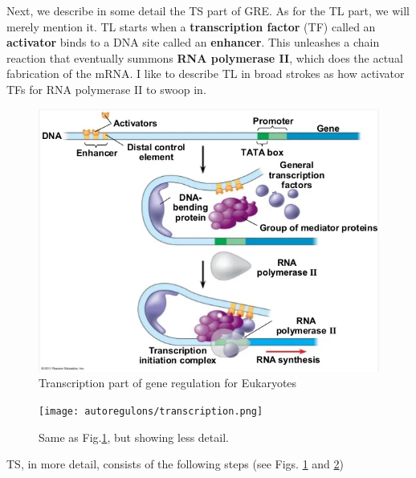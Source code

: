 Next, we describe
in some detail the TS
part of GRE. As for the TL
part, we will merely mention it. TL starts
when a {\bf transcription factor} (TF) called an {\bf activator}
binds to a DNA site called
an {\bf enhancer}. This unleashes
a chain reaction that eventually summons {\bf RNA polymerase II}, which does the actual fabrication of the mRNA. I like to describe TL in broad strokes as how 
activator TFs   for RNA polymerase II to swoop in.

\begin{figure}[h!]
\centering
\includegraphics[width=5in]
{autoregulons/transcription-detailed}
\caption{Transcription part of gene regulation for Eukaryotes}
\label{fig-transcription-detailed}
\end{figure}

\begin{figure}[h!]
\centering
\texttt{[image: autoregulons/transcription.png]}
\caption{Same as Fig.\ref{fig-transcription-detailed},
but showing less detail.}
\label{fig-transcription}
\end{figure}

TS, in more detail, consists
of the following steps (see Figs.
\ref{fig-transcription-detailed}
and \ref{fig-transcription})

